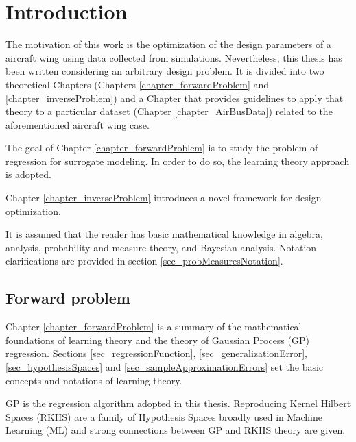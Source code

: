 \chapter{Introduction} \label{chapter_introduction} 


The motivation of this work is the optimization of the design parameters of a aircraft wing using data collected from simulations. 
Nevertheless, this thesis has been written considering an arbitrary design problem. It is divided into two theoretical Chapters (Chapters \ref{chapter_forwardProblem} and \ref{chapter_inverseProblem}) and a Chapter that provides guidelines to apply that theory to a particular dataset (Chapter \ref{chapter_AirBusData}) related to the aforementioned aircraft wing case.

The goal of Chapter \ref{chapter_forwardProblem} is to study the problem of regression for surrogate modeling.
In order to do so, the learning theory approach is adopted.

Chapter \ref{chapter_inverseProblem} introduces a novel framework for design optimization.

It is assumed that the reader has basic mathematical knowledge in algebra, analysis, probability and measure theory, and Bayesian analysis. Notation clarifications are provided in section \ref{sec_probMeasuresNotation}.

\section{Forward problem}

Chapter \ref{chapter_forwardProblem} is a summary of the mathematical foundations of learning theory and the theory of Gaussian Process (GP) regression.
Sections \ref{sec_regressionFunction}, \ref{sec_generalizationError}, \ref{sec_hypothesisSpaces} and \ref{sec_sampleApproximationErrors} set the basic concepts and notations of learning theory.

GP is the regression algorithm adopted in this thesis. 
Reproducing Kernel Hilbert Spaces (RKHS) are a family of Hypothesis Spaces broadly used in Machine Learning (ML) and strong connections between GP and RKHS theory are given.

